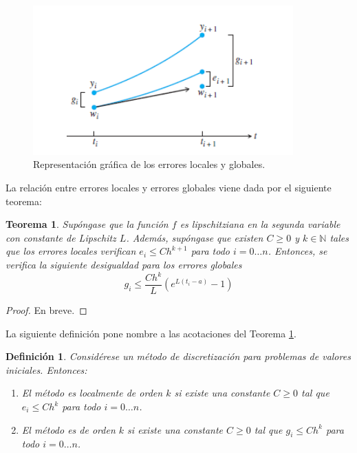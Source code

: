 \documentclass{article}
\theoremstyle{theorem-style}  %
\newtheorem{theorem}{Teorema}[section]  %
\theoremstyle{definition-style}
\newtheorem{definition}{Definición}[section]
\theoremstyle{example-style}
\begin{document}
	\begin{figure}[h]
		\centering
		\includegraphics[width=10cm]{./Images/error-euler.png}
		\caption{Representación gráfica de los errores locales y globales.} 
		\label{fig:error}
	\end{figure}
	
	La relación entre errores locales y errores globales viene dada por el siguiente teorema: \\
	
	\begin{theorem} \label{theorem:local-global-error}
		Supóngase que la función $f$ es lipschitziana en la segunda variable con constante de Lipschitz $L$. Además, supóngase que existen $C \ge 0$ y $k \in \mathbb{N}$ tales que los errores locales verifican $e_i \le C h^{k+1}$ para todo $i = 0 \ldots n$. Entonces, se verifica la siguiente desigualdad para los errores globales
		\begin{equation}
			g_i \le \frac{C h^k}{L} (e^{L(t_i-a)}-1)
		\end{equation}
	\end{theorem} 
	\begin{proof}
		En breve.
	\end{proof}
	
	La siguiente definición pone nombre a las acotaciones del Teorema \ref{theorem:local-global-error}.
	
	\begin{definition} 
		Considérese un método de discretización para problemas de valores iniciales. Entonces:
		\begin{enumerate}
			\item El método es localmente de orden $k$ si existe una constante $C \ge 0$ tal que $e_i \le C h^k$ para todo $i = 0 \ldots n$.
			\item El método es de orden $k$ si existe una constante $C \ge 0$ tal que $g_i \le C h^k$ para todo $i = 0 \ldots n$.
		\end{enumerate}
	\end{definition}
	
\end{document}
